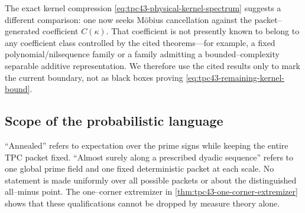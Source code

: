 The exact kernel compression
\eqref{eq:tpc43-physical-kernel-spectrum} suggests a different comparison:
one now seeks M\"obius cancellation against the packet--generated
coefficient \(C(\kappa)\).  That coefficient is not presently known to
belong to any coefficient class controlled by the cited theorems---for
example, a fixed polynomial/nilsequence family or a family admitting a
bounded--complexity separable additive representation.  We therefore use
the cited results only to mark the current boundary, not as black boxes proving
\eqref{eq:tpc43-remaining-kernel-bound}.

\subsection{Scope of the probabilistic language}

``Annealed'' refers to expectation over the prime signs while keeping the
entire TPC packet fixed.  ``Almost surely along a prescribed dyadic
sequence'' refers to one global prime field and one fixed deterministic
packet at each scale.  No statement is made uniformly over all possible
packets or about the distinguished all--minus point.  The one--corner
extremizer in \cref{thm:tpc43-one-corner-extremizer} shows that these
qualifications cannot be dropped by measure theory alone.
